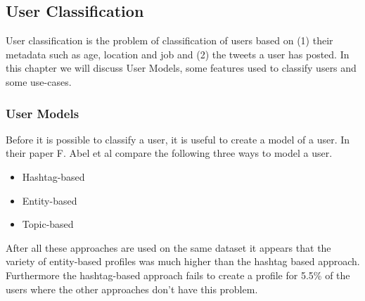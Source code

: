 \documentclass{article}
\begin{document}
\subsection{User Classification}
User classification is the problem of classification of users based on (1) their metadata such as age, location and job and (2) the tweets a user has posted. In this chapter we will discuss User Models, some features used to classify users and some use-cases. 
\subsubsection{User Models}
Before it is possible to classify a user, it is useful to create a model of a user. In their paper F. Abel et al compare the following three ways to model a user. \cite{usermodel}
\begin{itemize}
\item Hashtag-based
\item Entity-based
\item Topic-based

\end{itemize}
After all these approaches are used on the same dataset it appears that the variety of entity-based profiles was much higher than the hashtag based approach. \cite{usermodel} Furthermore the hashtag-based approach fails to create a profile for 5.5\% of the users where the other approaches don't have this problem.  
\end{document}
